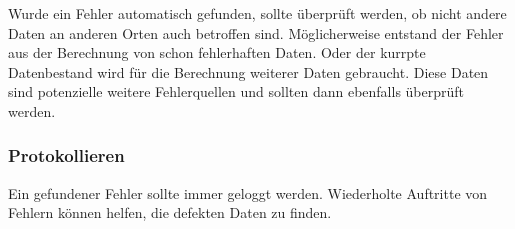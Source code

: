 Wurde ein Fehler automatisch gefunden, sollte überprüft werden, ob nicht andere Daten an anderen Orten auch betroffen sind. Möglicherweise entstand der Fehler aus der Berechnung von schon fehlerhaften Daten. Oder der kurrpte Datenbestand wird für die Berechnung weiterer Daten gebraucht. Diese Daten sind potenzielle weitere Fehlerquellen und sollten dann ebenfalls überprüft werden.

\subsubsection*{Protokollieren}

Ein gefundener Fehler sollte immer geloggt werden. Wiederholte Auftritte von Fehlern können helfen, die defekten Daten zu finden.
